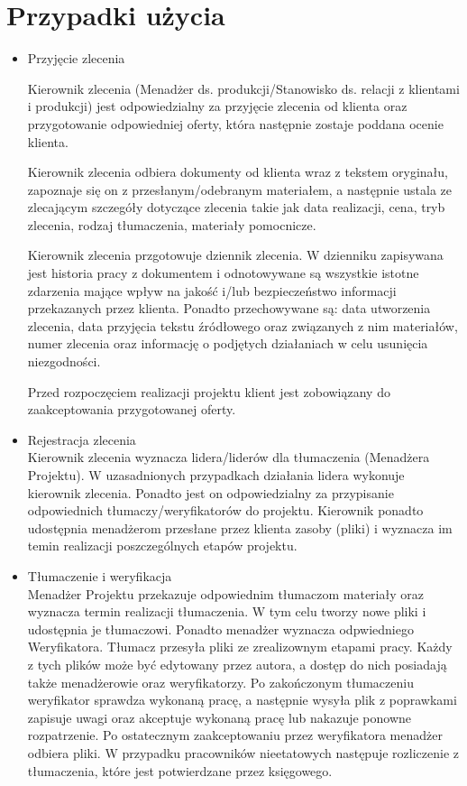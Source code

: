 \documentclass[licencjacka]{pracamgr}
\begin{document}
\section{Przypadki użycia}
\begin{itemize} 
\item Przyjęcie zlecenia

Kierownik zlecenia (Menadżer ds. produkcji/Stanowisko ds. relacji z klientami i produkcji) 
jest odpowiedzialny za przyjęcie zlecenia od klienta oraz przygotowanie odpowiedniej oferty, 
która następnie zostaje poddana ocenie klienta.

Kierownik zlecenia odbiera dokumenty od klienta wraz z tekstem oryginału, zapoznaje się on z przesłanym/odebranym materiałem,
a następnie ustala ze zlecającym szczegóły dotyczące zlecenia takie jak data realizacji, cena,  tryb zlecenia, rodzaj tłumaczenia, materiały pomocnicze.

Kierownik zlecenia przgotowuje dziennik zlecenia. W dzienniku zapisywana jest historia pracy z dokumentem i 
odnotowywane są wszystkie istotne zdarzenia mające wpływ na jakość i/lub bezpieczeństwo informacji przekazanych przez klienta. 
Ponadto przechowywane są: data utworzenia zlecenia, data przyjęcia tekstu źródłowego oraz związanych z nim materiałów, numer zlecenia oraz informację o podjętych działaniach w celu usunięcia niezgodności. 

Przed rozpoczęciem realizacji projektu klient jest zobowiązany do zaakceptowania przygotowanej oferty.

\item Rejestracja zlecenia \\
Kierownik zlecenia wyznacza lidera/liderów dla tłumaczenia (Menadżera Projektu). W uzasadnionych przypadkach działania lidera wykonuje kierownik zlecenia.
Ponadto jest on odpowiedzialny za przypisanie odpowiednich tłumaczy/weryfikatorów do projektu.
Kierownik ponadto udostępnia menadżerom przesłane przez klienta zasoby (pliki) i wyznacza im temin realizacji poszczególnych etapów projektu.

\item Tłumaczenie i weryfikacja\\
Menadżer Projektu przekazuje odpowiednim tłumaczom materiały oraz wyznacza termin realizacji tłumaczenia.
W tym celu tworzy nowe pliki i udostępnia je tłumaczowi.
Ponadto menadżer wyznacza odpwiedniego Weryfikatora.
Tłumacz przesyła pliki ze zrealizownym etapami pracy. Każdy z tych plików może być edytowany przez autora, a dostęp do nich posiadają także menadżerowie oraz weryfikatorzy.
Po zakończonym tłumaczeniu weryfikator sprawdza wykonaną pracę, a następnie wysyła plik z poprawkami zapisuje uwagi oraz akceptuje wykonaną pracę lub nakazuje ponowne rozpatrzenie.
Po ostatecznym zaakceptowaniu przez weryfikatora menadżer odbiera pliki.
W przypadku pracowników nieetatowych następuje rozliczenie z tłumaczenia, które jest potwierdzane przez księgowego.


\end{itemize}
\end{document}
